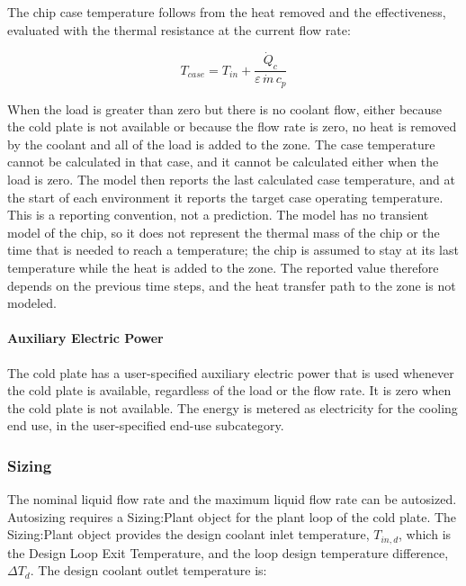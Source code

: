 The chip case temperature follows from the heat removed and the effectiveness, evaluated with the thermal resistance at the current flow rate:

\begin{equation}
T_{case} = T_{in} + \frac{\dot{Q}_{c}}{\varepsilon \, \dot{m} \, c_p}
\end{equation}

When the load is greater than zero but there is no coolant flow, either because the cold plate is not available or because the flow rate is zero, no heat is removed by the coolant and all of the load is added to the zone. The case temperature cannot be calculated in that case, and it cannot be calculated either when the load is zero. The model then reports the last calculated case temperature, and at the start of each environment it reports the target case operating temperature. This is a reporting convention, not a prediction. The model has no transient model of the chip, so it does not represent the thermal mass of the chip or the time that is needed to reach a temperature; the chip is assumed to stay at its last temperature while the heat is added to the zone. The reported value therefore depends on the previous time steps, and the heat transfer path to the zone is not modeled.

\paragraph{Auxiliary Electric Power}\label{auxiliary-electric-power-coilcoolingitecoldplate}

The cold plate has a user-specified auxiliary electric power that is used whenever the cold plate is available, regardless of the load or the flow rate. It is zero when the cold plate is not available. The energy is metered as electricity for the cooling end use, in the user-specified end-use subcategory.

\subsubsection{Sizing}\label{sizing-coilcoolingitecoldplate}

The nominal liquid flow rate and the maximum liquid flow rate can be autosized. Autosizing requires a Sizing:Plant object for the plant loop of the cold plate. The Sizing:Plant object provides the design coolant inlet temperature, \(T_{in,d}\), which is the Design Loop Exit Temperature, and the loop design temperature difference, \(\Delta T_{d}\). The design coolant outlet temperature is:

